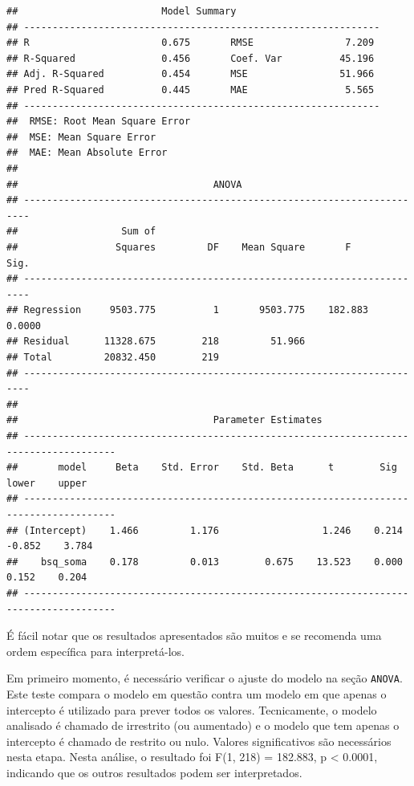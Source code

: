 \documentclass[
]{book}
\begin{document}
\begin{verbatim}
##                         Model Summary                          
## --------------------------------------------------------------
## R                       0.675       RMSE                7.209 
## R-Squared               0.456       Coef. Var          45.196 
## Adj. R-Squared          0.454       MSE                51.966 
## Pred R-Squared          0.445       MAE                 5.565 
## --------------------------------------------------------------
##  RMSE: Root Mean Square Error 
##  MSE: Mean Square Error 
##  MAE: Mean Absolute Error 
## 
##                                  ANOVA                                  
## -----------------------------------------------------------------------
##                  Sum of                                                
##                 Squares         DF    Mean Square       F         Sig. 
## -----------------------------------------------------------------------
## Regression     9503.775          1       9503.775    182.883    0.0000 
## Residual      11328.675        218         51.966                      
## Total         20832.450        219                                     
## -----------------------------------------------------------------------
## 
##                                  Parameter Estimates                                   
## --------------------------------------------------------------------------------------
##       model     Beta    Std. Error    Std. Beta      t        Sig      lower    upper 
## --------------------------------------------------------------------------------------
## (Intercept)    1.466         1.176                  1.246    0.214    -0.852    3.784 
##    bsq_soma    0.178         0.013        0.675    13.523    0.000     0.152    0.204 
## --------------------------------------------------------------------------------------
\end{verbatim}

É fácil notar que os resultados apresentados são muitos e se recomenda uma ordem específica para interpretá-los.

Em primeiro momento, é necessário verificar o ajuste do modelo na seção \texttt{ANOVA}. Este teste compara o modelo em questão contra um modelo em que apenas o intercepto é utilizado para prever todos os valores. Tecnicamente, o modelo analisado é chamado de irrestrito (ou aumentado) e o modelo que tem apenas o intercepto é chamado de restrito ou nulo. Valores significativos são necessários nesta etapa. Nesta análise, o resultado foi F(1, 218) = 182.883, p \textless{} 0.0001, indicando que os outros resultados podem ser interpretados.
\end{document}
